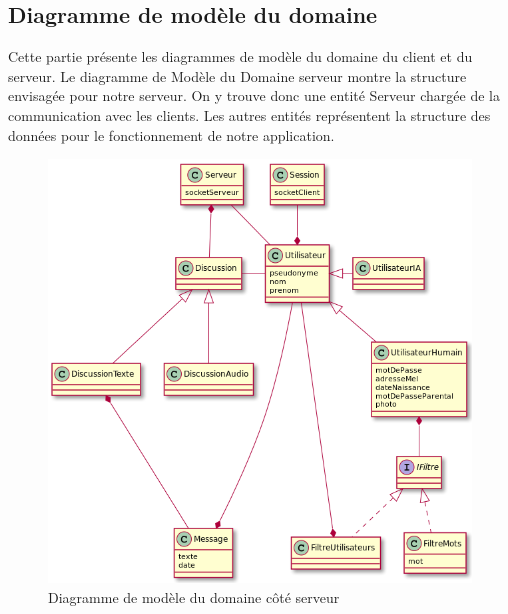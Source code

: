 \documentclass[a4paper,12pt]{article}
\begin{document}
	\subsection{Diagramme de modèle du domaine}
	Cette partie présente les diagrammes de modèle du domaine du client et du serveur.
	Le diagramme de Modèle du Domaine serveur montre la structure envisagée pour notre serveur.
	On y trouve donc une entité Serveur chargée de la communication avec les clients.
	Les autres entités représentent la structure des données pour le fonctionnement de notre application.

	\begin{figure}[H]
		\centerline{\includegraphics[width=16.5cm]{../diagrammes/img/modeleDomaineServeur.png}}
		\caption{Diagramme de modèle du domaine côté serveur}
	\end{figure}

	\newpage
\end{document}
